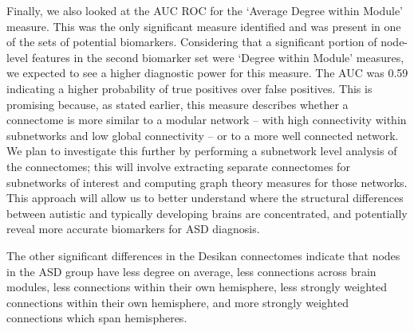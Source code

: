 \documentclass[11pt,conference]{IEEEtran}
\begin{document}
Finally, we also looked at the AUC ROC for the `Average Degree within Module' measure. This 
was the only significant measure identified and was present in one of the sets of potential 
biomarkers. Considering that a significant portion of node-level features in the second 
biomarker set were `Degree within Module' measures, we expected to see a higher diagnostic 
power for this measure. The AUC was 0.59 indicating a higher probability of true positives 
over false positives. This is promising because, as stated earlier, this measure describes 
whether a connectome is more similar to a modular network -- with high connectivity within 
subnetworks and low global connectivity -- or to a more well connected network. We plan to 
investigate this further by performing a subnetwork level analysis of the connectomes; this 
will involve extracting separate connectomes for subnetworks of interest and computing 
graph theory measures for those networks. This approach will allow us to better understand 
where the structural differences between autistic and typically developing brains are 
concentrated, and potentially reveal more accurate biomarkers for ASD diagnosis.
 

The other significant differences
in the Desikan connectomes indicate that nodes in the ASD
group have less degree on average, less connections across
brain modules, less connections within their own hemisphere,
less strongly weighted connections within their own hemisphere, and more strongly weighted connections which span
hemispheres.



\end{document}
